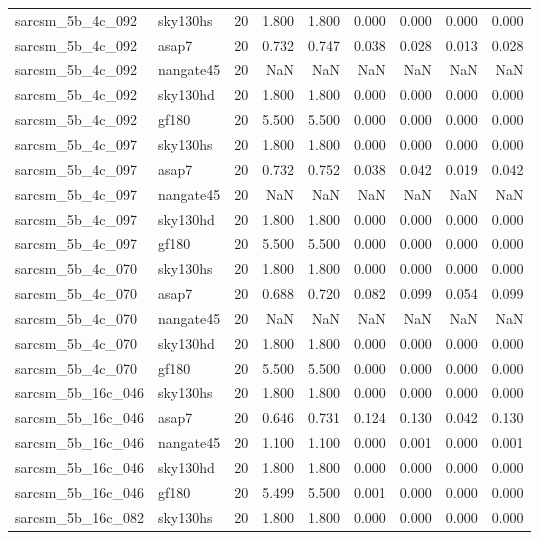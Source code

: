 \begin{tabular}{llrrrrrrr}
sarcsm\_5b\_4c\_092 & sky130hs & 20 & 1.800 & 1.800 & 0.000 & 0.000 & 0.000 & 0.000 \\
sarcsm\_5b\_4c\_092 & asap7 & 20 & 0.732 & 0.747 & 0.038 & 0.028 & 0.013 & 0.028 \\
sarcsm\_5b\_4c\_092 & nangate45 & 20 & NaN & NaN & NaN & NaN & NaN & NaN \\
sarcsm\_5b\_4c\_092 & sky130hd & 20 & 1.800 & 1.800 & 0.000 & 0.000 & 0.000 & 0.000 \\
sarcsm\_5b\_4c\_092 & gf180 & 20 & 5.500 & 5.500 & 0.000 & 0.000 & 0.000 & 0.000 \\
sarcsm\_5b\_4c\_097 & sky130hs & 20 & 1.800 & 1.800 & 0.000 & 0.000 & 0.000 & 0.000 \\
sarcsm\_5b\_4c\_097 & asap7 & 20 & 0.732 & 0.752 & 0.038 & 0.042 & 0.019 & 0.042 \\
sarcsm\_5b\_4c\_097 & nangate45 & 20 & NaN & NaN & NaN & NaN & NaN & NaN \\
sarcsm\_5b\_4c\_097 & sky130hd & 20 & 1.800 & 1.800 & 0.000 & 0.000 & 0.000 & 0.000 \\
sarcsm\_5b\_4c\_097 & gf180 & 20 & 5.500 & 5.500 & 0.000 & 0.000 & 0.000 & 0.000 \\
sarcsm\_5b\_4c\_070 & sky130hs & 20 & 1.800 & 1.800 & 0.000 & 0.000 & 0.000 & 0.000 \\
sarcsm\_5b\_4c\_070 & asap7 & 20 & 0.688 & 0.720 & 0.082 & 0.099 & 0.054 & 0.099 \\
sarcsm\_5b\_4c\_070 & nangate45 & 20 & NaN & NaN & NaN & NaN & NaN & NaN \\
sarcsm\_5b\_4c\_070 & sky130hd & 20 & 1.800 & 1.800 & 0.000 & 0.000 & 0.000 & 0.000 \\
sarcsm\_5b\_4c\_070 & gf180 & 20 & 5.500 & 5.500 & 0.000 & 0.000 & 0.000 & 0.000 \\
sarcsm\_5b\_16c\_046 & sky130hs & 20 & 1.800 & 1.800 & 0.000 & 0.000 & 0.000 & 0.000 \\
sarcsm\_5b\_16c\_046 & asap7 & 20 & 0.646 & 0.731 & 0.124 & 0.130 & 0.042 & 0.130 \\
sarcsm\_5b\_16c\_046 & nangate45 & 20 & 1.100 & 1.100 & 0.000 & 0.001 & 0.000 & 0.001 \\
sarcsm\_5b\_16c\_046 & sky130hd & 20 & 1.800 & 1.800 & 0.000 & 0.000 & 0.000 & 0.000 \\
sarcsm\_5b\_16c\_046 & gf180 & 20 & 5.499 & 5.500 & 0.001 & 0.000 & 0.000 & 0.000 \\
sarcsm\_5b\_16c\_082 & sky130hs & 20 & 1.800 & 1.800 & 0.000 & 0.000 & 0.000 & 0.000 \\

\end{tabular}
